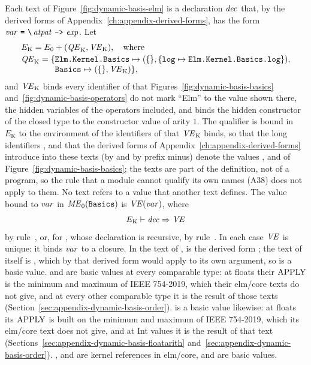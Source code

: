 Each text of Figure~\ref{fig:dynamic-basis-elm} is a declaration $\mathit{dec}$ that,
by the derived forms of Appendix~\ref{ch:appendix-derived-forms}, has the
form $\var\ \kw{=}\ \kw{\textbackslash}\,\atpat\ \kw{->}\ \expm$. Let
\[
  \begin{array}{@{}l@{}}
  E_{\mathrm{K}}=E_0+(\QE_{\mathrm{K}},\VE_{\mathrm{K}}),\quad\text{where}\\[0.5ex]
  \QE_{\mathrm{K}}=\{\kw{Elm.Kernel.Basics}\mapsto(\emptymap,\{\kw{log}\mapsto\kw{Elm.Kernel.Basics.log}\}),\\
  \phantom{\QE_{\mathrm{K}}=\{}\kw{Basics}\mapsto(\emptymap,\VE_{\mathrm{K}})\},
  \end{array}
\]
and $\mathit{VE}_{\mathrm{K}}$ binds every identifier of  that
Figures~\ref{fig:dynamic-basis-basics} and~\ref{fig:dynamic-basis-operators}
do not mark ``Elm'' to the value shown there, the hidden variables of the
operators included, and binds the hidden constructor  of the
closed type  to the constructor value  of arity
$1$. The qualifier  is bound in $E_{\mathrm{K}}$ to the
environment of the identifiers of  that $\mathit{VE}_{\mathrm{K}}$ binds,
so that the long identifiers ,  and
 that the derived forms of
Appendix~\ref{ch:appendix-derived-forms} introduce into these texts (by
 and by prefix minus) denote the values ,  and
 of Figure~\ref{fig:dynamic-basis-basics}; the texts are part of
the definition, not of a program, so the rule that a module cannot qualify
its own names (A38) does not apply to them.
No text refers
to a value that another text defines. The value bound to $\mathit{var}$ in
$\mathit{ME}_0(\textnormal{\texttt{Basics}})$ is $\mathit{VE}(\mathit{var})$, where
\[
  E_{\mathrm{K}} \vdash \mathit{dec} \Rightarrow \mathit{VE}
\]
by rule~, or, for , whose declaration is
recursive, by rule~. In each case $\mathit{VE}$ is unique: it
binds $\mathit{var}$ to a closure. %
In the text of ,  is the derived form ;
the text of  itself is , which by that derived form would
apply  to its own argument, so  is a basic value.
 and  are basic values at every comparable type: at floats
their $\mathrm{APPLY}$ is the minimum and maximum of IEEE 754-2019, which their
elm/core texts do not give, and at every other comparable type it is the
result of those texts (Section~\ref{sec:appendix-dynamic-basis-order}). %
 is a basic value likewise: at floats its $\mathrm{APPLY}$ is built on the
minimum and maximum of IEEE 754-2019, which its elm/core text does not
give, and at Int values it is the result of that text
(Sections~\ref{sec:appendix-dynamic-basis-floatarith}
and~\ref{sec:appendix-dynamic-basis-order}). %
,  and  are kernel
references in elm/core, and are basic values.

